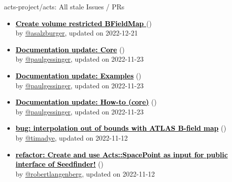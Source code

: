 \begin{frame}[allowframebreaks]{ acts-project/acts: All stale Issues / PRs}
\begin{itemize}
    \item\iss\prstale\textbf{\href{https://github.com/acts-project/acts/issues/1659}{\textcolor{black}{Create volume restricted BFieldMap }}}
    (\href{https://github.com/acts-project/acts/issues/1659}{}) \\
    by \href{https://github.com/asalzburger}{@asalzburger}, updated on 2022-12-21

    \item\iss\prstale\textbf{\href{https://github.com/acts-project/acts/issues/1418}{\textcolor{black}{Documentation update: Core}}}
    (\href{https://github.com/acts-project/acts/issues/1418}{}) \\
    by \href{https://github.com/paulgessinger}{@paulgessinger}, updated on 2022-11-23

    \item\iss\prstale\textbf{\href{https://github.com/acts-project/acts/issues/1420}{\textcolor{black}{Documentation update: Examples}}}
    (\href{https://github.com/acts-project/acts/issues/1420}{}) \\
    by \href{https://github.com/paulgessinger}{@paulgessinger}, updated on 2022-11-23

    \item\iss\prstale\textbf{\href{https://github.com/acts-project/acts/issues/1422}{\textcolor{black}{Documentation update: How-to (core)}}}
    (\href{https://github.com/acts-project/acts/issues/1422}{}) \\
    by \href{https://github.com/paulgessinger}{@paulgessinger}, updated on 2022-11-23

    \item\iss\prstale\textbf{\href{https://github.com/acts-project/acts/issues/1484}{\textcolor{black}{bug: interpolation out of bounds with ATLAS B-field map}}}
    (\href{https://github.com/acts-project/acts/issues/1484}{}) \\
    by \href{https://github.com/timadye}{@timadye}, updated on 2022-11-12

    \item\propen\prwip\prstale\textbf{\href{https://github.com/acts-project/acts/pull/1394}{\textcolor{black}{refactor: Create and use Acts::SpacePoint as input for public interface of Seedfinder!}}}
    (\href{https://github.com/acts-project/acts/pull/1394}{}) \\
    by \href{https://github.com/robertlangenberg}{@robertlangenberg}, updated on 2022-11-12


\end{itemize}
\end{frame}
